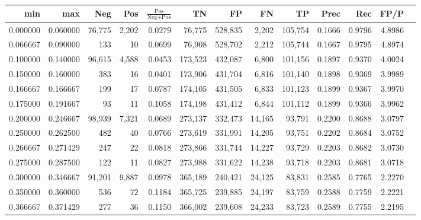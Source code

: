 \begin{tabular}{rrrrrrrrrrrrr}
\toprule
     min &      max &    Neg &    Pos & $\frac{\text{Pos}}{\text{Neg}+\text{Pos}}$ &      TN &      FP &      FN &      TP &   Prec &    Rec &   FP/P \\
\midrule
0.000000 & 0.060000 & 76,775 &  2,202 &                                     0.0279 &  76,775 & 528,835 &   2,202 & 105,754 & 0.1666 & 0.9796 & 4.8986 \\
0.066667 & 0.090000 &    133 &     10 &                                     0.0699 &  76,908 & 528,702 &   2,212 & 105,744 & 0.1667 & 0.9795 & 4.8974 \\
0.100000 & 0.140000 & 96,615 &  4,588 &                                     0.0453 & 173,523 & 432,087 &   6,800 & 101,156 & 0.1897 & 0.9370 & 4.0024 \\
0.150000 & 0.160000 &    383 &     16 &                                     0.0401 & 173,906 & 431,704 &   6,816 & 101,140 & 0.1898 & 0.9369 & 3.9989 \\
0.166667 & 0.166667 &    199 &     17 &                                     0.0787 & 174,105 & 431,505 &   6,833 & 101,123 & 0.1899 & 0.9367 & 3.9970 \\
0.175000 & 0.191667 &     93 &     11 &                                     0.1058 & 174,198 & 431,412 &   6,844 & 101,112 & 0.1899 & 0.9366 & 3.9962 \\
0.200000 & 0.246667 & 98,939 &  7,321 &                                     0.0689 & 273,137 & 332,473 &  14,165 &  93,791 & 0.2200 & 0.8688 & 3.0797 \\
0.250000 & 0.262500 &    482 &     40 &                                     0.0766 & 273,619 & 331,991 &  14,205 &  93,751 & 0.2202 & 0.8684 & 3.0752 \\
0.266667 & 0.271429 &    247 &     22 &                                     0.0818 & 273,866 & 331,744 &  14,227 &  93,729 & 0.2203 & 0.8682 & 3.0730 \\
0.275000 & 0.287500 &    122 &     11 &                                     0.0827 & 273,988 & 331,622 &  14,238 &  93,718 & 0.2203 & 0.8681 & 3.0718 \\
0.300000 & 0.346667 & 91,201 &  9,887 &                                     0.0978 & 365,189 & 240,421 &  24,125 &  83,831 & 0.2585 & 0.7765 & 2.2270 \\
0.350000 & 0.360000 &    536 &     72 &                                     0.1184 & 365,725 & 239,885 &  24,197 &  83,759 & 0.2588 & 0.7759 & 2.2221 \\
0.366667 & 0.371429 &    277 &     36 &                                     0.1150 & 366,002 & 239,608 &  24,233 &  83,723 & 0.2589 & 0.7755 & 2.2195 \\

\end{tabular}
